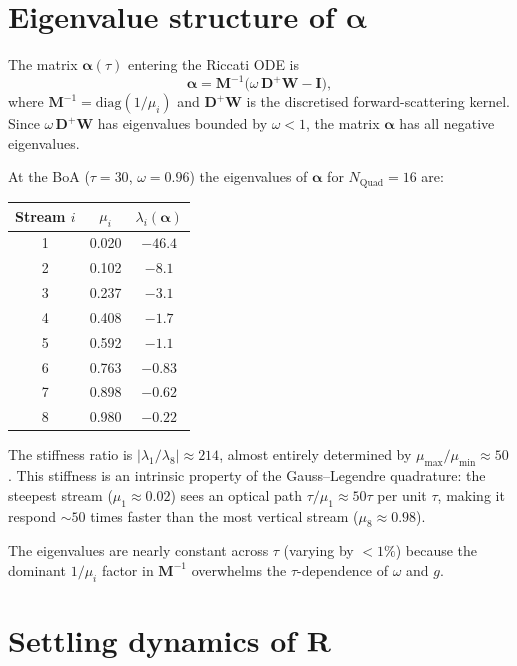 \documentclass[11pt]{article}
\newcommand{\bR}{\mathbf{R}}
\newcommand{\bI}{\mathbf{I}}
\newcommand{\balpha}{\boldsymbol{\alpha}}
\begin{document}
\section{Eigenvalue structure of $\balpha$}
\label{sec:eigenvalues}

The matrix $\balpha(\tau)$ entering the Riccati ODE is
\[
  \balpha = \mathbf{M}^{-1}\!\bigl(\omega\,\mathbf{D}^+\!\mathbf{W}
    - \bI\bigr),
\]
where $\mathbf{M}^{-1} = \mathrm{diag}(1/\mu_i)$ and
$\mathbf{D}^+\!\mathbf{W}$ is the discretised forward-scattering kernel.
Since $\omega\,\mathbf{D}^+\!\mathbf{W}$ has eigenvalues bounded by
$\omega<1$, the matrix $\balpha$ has all negative eigenvalues.

At the BoA ($\tau=30$, $\omega=0.96$) the eigenvalues of $\balpha$
for $N_\mathrm{Quad}=16$ are:

\begin{center}
\begin{tabular}{ccc}
\toprule
Stream $i$ & $\mu_i$ & $\lambda_i(\balpha)$\\
\midrule
1 & 0.020 & $-46.4$\\
2 & 0.102 & $-8.1$\\
3 & 0.237 & $-3.1$\\
4 & 0.408 & $-1.7$\\
5 & 0.592 & $-1.1$\\
6 & 0.763 & $-0.83$\\
7 & 0.898 & $-0.62$\\
8 & 0.980 & $-0.22$\\
\bottomrule
\end{tabular}
\end{center}

The stiffness ratio is $|\lambda_1/\lambda_8| \approx 214$,
almost entirely determined by $\mu_\mathrm{max}/\mu_\mathrm{min}
\approx 50$.  This stiffness is an intrinsic property of the
Gauss--Legendre quadrature: the steepest stream
($\mu_1\approx0.02$) sees an optical path $\tau/\mu_1\approx 50\tau$
per unit $\tau$, making it respond ${\sim}50$ times faster than
the most vertical stream ($\mu_8\approx0.98$).

The eigenvalues are nearly constant across $\tau$
(varying by $<1\%$) because the dominant $1/\mu_i$ factor in
$\mathbf{M}^{-1}$ overwhelms the $\tau$-dependence of
$\omega$ and $g$.


\section{Settling dynamics of $\bR$}
\end{document}
